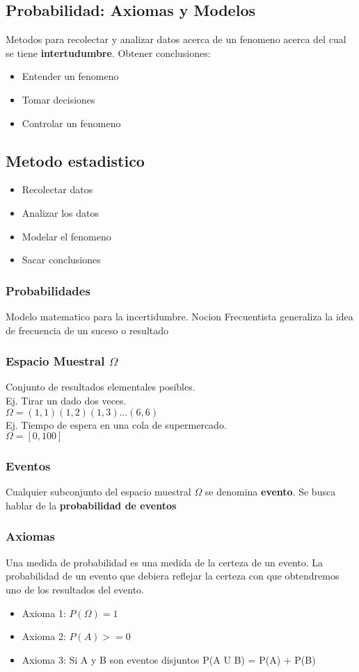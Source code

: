 \subsection{Probabilidad: Axiomas y Modelos}
Metodos para recolectar y analizar datos acerca de un fenomeno acerca del cual se tiene \textbf{intertudumbre}. Obtener conclusiones:
\begin{itemize}
\item Entender un fenomeno
\item Tomar decisiones
\item Controlar un fenomeno
\end{itemize}

\subsection{Metodo estadistico}
\begin{itemize}
\item Recolectar datos
\item Analizar los datos
\item Modelar el fenomeno
\item Sacar conclusiones
\end{itemize}

\subsubsection{Probabilidades}
Modelo matematico para la incertidumbre. Nocion Frecuentista generaliza la idea de frecuencia de un suceso o resultado

\subsubsection{Espacio Muestral $\Omega$}
Conjunto de resultados elementales posibles.\\
Ej. Tirar un dado dos veces.\\
$\Omega = {(1,1) (1,2) (1,3) \ldots (6,6)}$\\
Ej. Tiempo de espera en una cola de supermercado.\\
$\Omega = [0,100]$\\
\subsubsection{Eventos}
Cualquier subconjunto del espacio muestral $\Omega$ se denomina \textbf{evento}. Se busca hablar de la \textbf{probabilidad de eventos}
\subsubsection{Axiomas}
Una medida de probabilidad es una medida de la certeza de un evento. La probabilidad de un evento que debiera reflejar la certeza con que obtendremos uno de los resultados del evento.
\begin{itemize}
\item Axioma 1: $P(\Omega) = 1$
\item Axioma 2: $P(A) >= 0$
\item Axioma 3: Si A y B son eventos disjuntos P(A U B) = P(A) + P(B)
\end{itemize}
